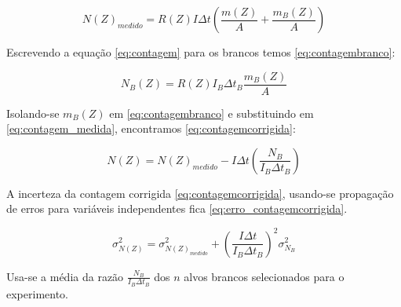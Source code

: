 \begin{equation}
  \label{eq:contagem_medida}
  N(Z)_{medido} = R(Z) I\Delta t \left( \frac{m(Z)}{A} + \frac{m_B(Z)}{A} \right)
\end{equation}  

Escrevendo a equação \ref{eq:contagem} para os brancos temos \ref{eq:contagembranco}:

\begin{equation}
  \label{eq:contagembranco}
  N_B(Z) = R(Z) I_B\Delta t_B \frac{m_B(Z)}{A}
\end{equation}

Isolando-se $m_B(Z)$ em \ref{eq:contagembranco} e substituindo em 
\ref{eq:contagem_medida}, encontramos \ref{eq:contagemcorrigida}:
 
\begin{equation}
  \label{eq:contagemcorrigida}
  N(Z) = N(Z)_{medido} - I\Delta t \left( \frac{N_B}{I_B \Delta t_B} \right)
\end{equation}


A incerteza da contagem corrigida \ref{eq:contagemcorrigida}, 
usando-se propagação de erros para variáveis independentes fica
\ref{eq:erro_contagemcorrigida}.

\begin{equation}
  \label{eq:erro_contagemcorrigida}
  \sigma_{N(Z)}^2 = \sigma_{N(Z)_{medido}}^2 + \left( \frac{I \Delta t}{I_B \Delta t_B} \right)^2 \sigma_{N_B}^2
\end{equation}

Usa-se a média da razão $\frac{N_B}{I_B \Delta t_B}$ dos $n$ alvos brancos
selecionados para o experimento. 






